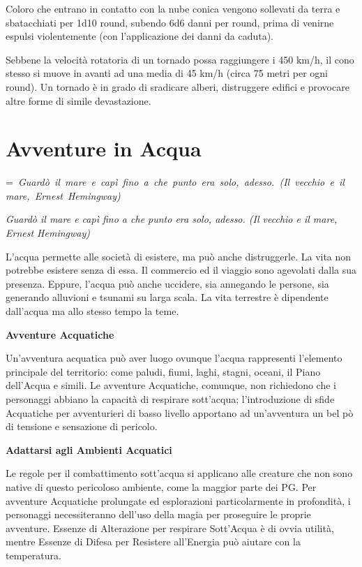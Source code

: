 \documentclass[a4paper,11pt,twoside,openany]{book}
\makeatletter
\newcommand{\mybox}[1]{%
	\setbox0=\hbox{#1}%
	\setlength{\@tempdima}{\dimexpr\wd0+13pt}%
	\begin{tcolorbox}[boxrule=0.5pt,arc=4pt, breakable,enhanced,
		left=6pt,right=6pt,top=6pt,bottom=6pt,boxsep=0pt,width=\@tempdima]
		#1
	\end{tcolorbox}
}
\makeatother
\begin{document}
{Coloro che entrano in contatto con la nube conica vengono sollevati da terra e sbatacchiati per 1d10 round, subendo 6d6 danni per round, prima di venirne espulsi violentemente (con l'applicazione dei danni da caduta).

Sebbene la velocità rotatoria di un tornado possa raggiungere i 450 km/h, il cono stesso si muove in avanti ad una media di 45 km/h (circa 75 metri per ogni round). Un tornado è in grado di sradicare alberi, distruggere edifici e provocare altre forme di simile devastazione.

\pagebreak

\section{Avventure in Acqua}

\label{avventure-in-acqua}
\mybox{\textit{
Guardò il mare e capì fino a che punto era solo, adesso. (Il vecchio e il mare, Ernest Hemingway)
}}\medskip

L'acqua permette alle società di esistere, ma può anche distruggerle. La vita non potrebbe esistere senza di essa. Il commercio ed il viaggio sono agevolati dalla sua presenza. Eppure, l'acqua può anche uccidere, sia annegando le persone, sia generando alluvioni e tsunami su larga scala. La vita terrestre è dipendente dall'acqua ma allo stesso tempo la teme.

\textbf{Avventure Acquatiche}

Un'avventura acquatica può aver luogo ovunque l'acqua rappresenti l'elemento principale del territorio: come paludi, fiumi, laghi, stagni, oceani, il Piano dell'Acqua e simili. Le avventure Acquatiche, comunque, non richiedono che i personaggi abbiano la capacità di respirare sott'acqua; l'introduzione di sfide Acquatiche per avventurieri di basso livello apportano ad un'avventura un bel pò di tensione e sensazione di pericolo.

\textbf{Adattarsi agli Ambienti Acquatici}

Le regole per il combattimento sott'acqua si applicano alle creature che non sono native di questo pericoloso ambiente, come la maggior parte dei PG. Per avventure Acquatiche prolungate ed esplorazioni particolarmente in profondità, i personaggi necessiteranno dell'uso della magia per proseguire le proprie avventure. Essenze di Alterazione per respirare Sott'Acqua è di ovvia utilità, mentre Essenze di Difesa per Resistere all'Energia può aiutare con la temperatura.

}
\end{document}
